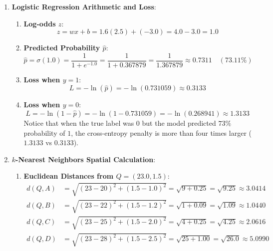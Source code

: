 \begin{enumerate}
    \item \textbf{Logistic Regression Arithmetic and Loss}:
    \begin{enumerate}[label=(\alph*)]
        \item \textbf{Log-odds $z$}:
        \begin{equation*}
        z = w x + b = 1.6(2.5) + (-3.0) = 4.0 - 3.0 = \mathbf{1.0}
        \end{equation*}

        \item \textbf{Predicted Probability $\hat{p}$}:
        \begin{equation*}
        \hat{p} = \sigma(1.0) = \frac{1}{1 + e^{-1.0}} = \frac{1}{1 + 0.367879} = \frac{1}{1.367879} \approx \mathbf{0.7311} \quad (73.11\%)
        \end{equation*}

        \item \textbf{Loss when $y = 1$}:
        \begin{equation*}
        L = -\ln(\hat{p}) = -\ln(0.731059) \approx \mathbf{0.3133}
        \end{equation*}

        \item \textbf{Loss when $y = 0$}:
        \begin{equation*}
        L = -\ln(1 - \hat{p}) = -\ln(1 - 0.731059) = -\ln(0.268941) \approx \mathbf{1.3133}
        \end{equation*}
        Notice that when the true label was $0$ but the model predicted $73\%$ probability of $1$, the cross-entropy penalty is more than four times larger ($1.3133$ vs $0.3133$).
    \end{enumerate}

    \item \textbf{$k$-Nearest Neighbors Spatial Calculation}:
    \begin{enumerate}[label=(\alph*)]
        \item \textbf{Euclidean Distances from $Q = (23.0, 1.5)$}:
        \begin{align*}
        d(Q, A) &= \sqrt{(23 - 20)^2 + (1.5 - 1.0)^2} = \sqrt{9 + 0.25} = \sqrt{9.25} \approx \mathbf{3.0414} \\
        d(Q, B) &= \sqrt{(23 - 22)^2 + (1.5 - 1.2)^2} = \sqrt{1 + 0.09} = \sqrt{1.09} \approx \mathbf{1.0440} \\
        d(Q, C) &= \sqrt{(23 - 25)^2 + (1.5 - 2.0)^2} = \sqrt{4 + 0.25} = \sqrt{4.25} \approx \mathbf{2.0616} \\
        d(Q, D) &= \sqrt{(23 - 28)^2 + (1.5 - 2.5)^2} = \sqrt{25 + 1.00} = \sqrt{26.0} \approx \mathbf{5.0990}
        \end{align*}


\end{enumerate}
\end{enumerate}

